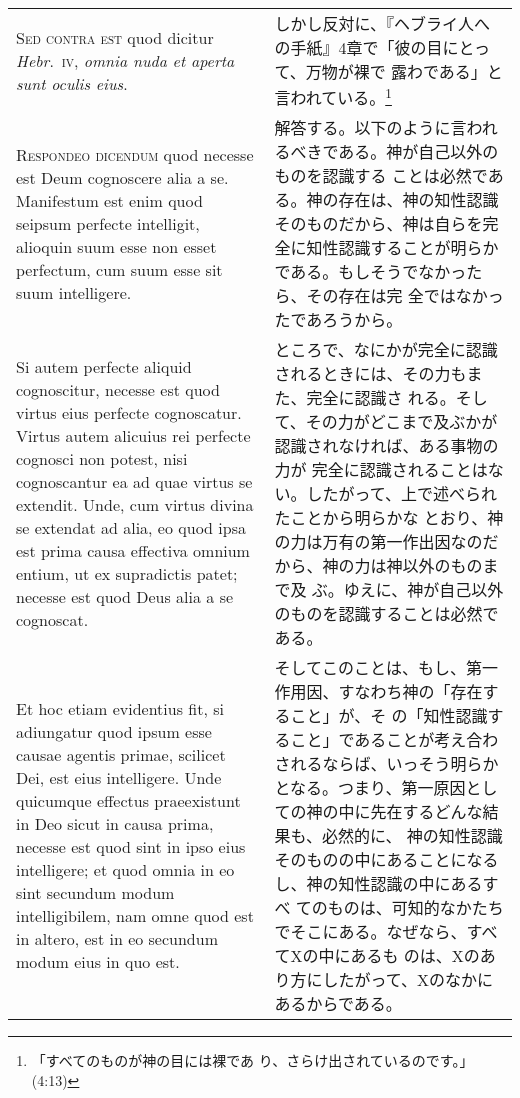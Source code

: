 \documentclass[10pt]{jsarticle} %
\begin{document}
\begin{longtable}{p{21em}p{21em}}
{\scshape Sed contra est} quod dicitur {\itshape Hebr}.~{\scshape iv},
{\itshape omnia nuda et aperta sunt oculis eius}.


&

しかし反対に、『ヘブライ人への手紙』4章で「彼の目にとって、万物が裸で
露わである」と言われている。\footnote{「すべてのものが神の目には裸であ
り、さらけ出されているのです。」(4:13)}

\\


{\scshape Respondeo dicendum} quod necesse est Deum
cognoscere alia a se. Manifestum est enim quod seipsum perfecte
intelligit, alioquin suum esse non esset perfectum, cum suum esse sit
suum intelligere. 


&

解答する。以下のように言われるべきである。神が自己以外のものを認識する
ことは必然である。神の存在は、神の知性認識そのものだから、神は自らを完
全に知性認識することが明らかである。もしそうでなかったら、その存在は完
全ではなかったであろうから。

\\

Si autem perfecte aliquid cognoscitur, necesse est
quod virtus eius perfecte cognoscatur. 
Virtus autem alicuius rei
perfecte cognosci non potest, nisi cognoscantur ea ad quae virtus se
extendit. Unde, cum virtus divina se extendat ad alia, eo quod ipsa est
prima causa effectiva omnium entium, ut ex supradictis patet; necesse
est quod Deus alia a se cognoscat. 


&

ところで、なにかが完全に認識されるときには、その力もまた、完全に認識さ
れる。そして、その力がどこまで及ぶかが認識されなければ、ある事物の力が
完全に認識されることはない。したがって、上で述べられたことから明らかな
とおり、神の力は万有の第一作出因なのだから、神の力は神以外のものまで及
ぶ。ゆえに、神が自己以外のものを認識することは必然である。


\\

Et hoc etiam evidentius fit, si
adiungatur quod ipsum esse causae agentis primae, scilicet Dei, est eius
intelligere. Unde quicumque effectus praeexistunt in Deo sicut in causa
prima, necesse est quod sint in ipso eius intelligere; et quod omnia in
eo sint secundum modum intelligibilem, nam omne quod est in altero, est
in eo secundum modum eius in quo est. 

&

そしてこのことは、もし、第一作用因、すなわち神の「存在すること」が、そ
の「知性認識すること」であることが考え合わされるならば、いっそう明らか
となる。つまり、第一原因としての神の中に先在するどんな結果も、必然的に、
神の知性認識そのものの中にあることになるし、神の知性認識の中にあるすべ
てのものは、可知的なかたちでそこにある。なぜなら、すべてXの中にあるも
のは、Xのあり方にしたがって、Xのなかにあるからである。


\end{longtable}
\end{document}
